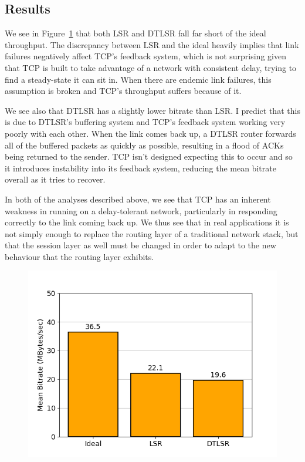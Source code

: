 \documentclass[withindex,glossary,openany]{cam-thesis}
\begin{document}
\subsection{Results}

We see in Figure~\ref{fig:tcp_5_30} that both LSR and DTLSR fall far short of the ideal throughput. The discrepancy between LSR and the ideal heavily implies that link failures negatively affect TCP's feedback system, which is not surprising given that TCP is built to take advantage of a network with consistent delay, trying to find a steady-state it can sit in. When there are endemic link failures, this assumption is broken and TCP's throughput suffers because of it.

We see also that DTLSR has a slightly lower bitrate than LSR. I predict that this is due to DTLSR's buffering system and TCP's feedback system working very poorly with each other. When the link comes back up, a DTLSR router forwards all of the buffered packets as quickly as possible, resulting in a flood of ACKs being returned to the sender. TCP isn't designed expecting this to occur and so it introduces instability into its feedback system, reducing the mean bitrate overall as it tries to recover.

In both of the analyses described above, we see that TCP has an inherent weakness in running on a delay-tolerant network, particularly in responding correctly to the link coming back up. We thus see that in real applications it is not simply enough to replace the routing layer of a traditional network stack, but that the session layer as well must be changed in order to adapt to the new behaviour that the routing layer exhibits.

\begin{figure}
  \centering
  \includegraphics[width=0.8\linewidth]{tcp_bar_flap5_30}
  \caption{}
  \label{fig:tcp_5_30}
\end{figure}
\end{document}
